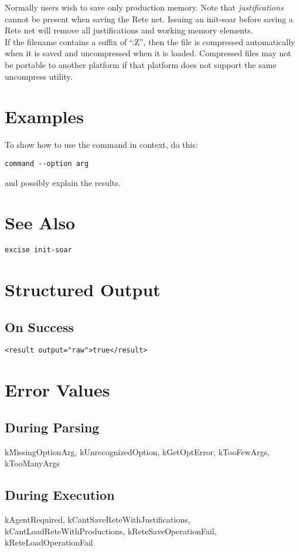 \documentclass[10pt]{article}
\begin{document}
  Normally users wish to save only production memory. Note that \emph{justifications}
 cannot be present when saving the Rete net. Issuing an init-soar before saving a Rete net will remove all justifications and working memory elements. \\ 
 If the filename contains a suffix of ``.Z'', then the file is compressed automatically when it is saved and uncompressed when it is loaded. Compressed files may not be portable to another platform if that platform does not support the same uncompress utility. 
\section*{ Examples }


 To show how to use the command in context, do this: \begin{verbatim}
command --option arg

\end{verbatim}



 and possibly explain the results. 
\section*{ See Also }
\begin{verbatim}
excise init-soar 

\end{verbatim}
\section*{ Structured Output }
\subsection*{ On Success }
\begin{verbatim}
<result output="raw">true</result>

\end{verbatim}
\section*{ Error Values }
\subsection*{ During Parsing }


 kMissingOptionArg, kUnrecognizedOption, kGetOptError, kTooFewArgs, kTooManyArgs
\subsection*{ During Execution }
kAgentRequired, kCantSaveReteWithJustifications, kCantLoadReteWithProductions, kReteSaveOperationFail, kReteLoadOperationFail
\end{document}
